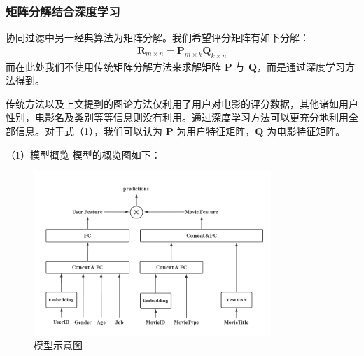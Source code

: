 \begin{spacing}{1.5}
\subsubsection{矩阵分解结合深度学习}
协同过滤中另一经典算法为矩阵分解。我们希望评分矩阵有如下分解： 
{\setlength\abovedisplayskip{1pt}
\setlength\belowdisplayskip{1pt}
\begin{align}
\mathbf{R}_{m\times n}=\mathbf{P}_{m\times k}\mathbf{Q}_{k\times n}
\end{align}
}
而在此处我们不使用传统矩阵分解方法来求解矩阵 $\mathbf{P}$ 与 $\mathbf{Q}$，而是通过深度学习方法得到。\par
传统方法以及上文提到的图论方法仅利用了用户对电影的评分数据，其他诸如用户性别，电影名及类别等等信息则没有利用。通过深度学习方法可以更充分地利用全部信息。对于式（1），我们可以认为 $\mathbf{P}$ 为用户特征矩阵，$\mathbf{Q}$ 为电影特征矩阵。\par
（1）模型概览
模型的概览图如下：
\clearpage
\begin{figure}
\setlength{\abovecaptionskip}{0.cm}
\setlength{\belowcaptionskip}{-0.cm}
\centering
\includegraphics[width=0.8\textwidth]{Figure/2.png}
\caption{模型示意图}
\end{figure}

\par


\end{spacing}
